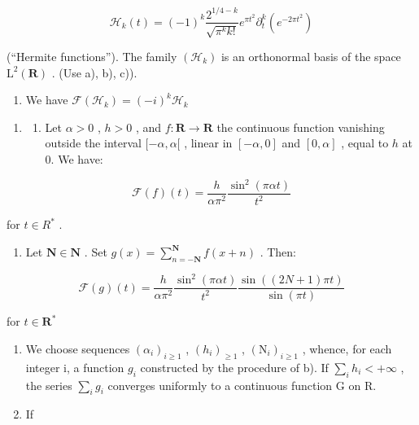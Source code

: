 \[
\mathcal {H} _ {k} (t) = (- 1) ^ {k} \frac {2 ^ {1 / 4 - k}}{\sqrt {\pi^ {k} k !}} e ^ {\pi t ^ {2}} \partial_ {t} ^ {k} (e ^ {- 2 \pi t ^ {2}})
\]

(“Hermite functions”). The family \((\mathcal{H}_{k})\) is an orthonormal basis of the space \(\mathrm{L}^{2}(\mathbf{R})\) . (Use a), b), c)).

\begin{enumerate}
\def\labelenumi{\alph{enumi})}
\setcounter{enumi}{4}
\tightlist
\item
  We have \(\mathcal{F}(\mathcal{H}_k) = (-i)^k\mathcal{H}_k\)
\end{enumerate}

\begin{enumerate}
\def\labelenumi{\arabic{enumi})}
\setcounter{enumi}{3}
\tightlist
\item
  \begin{enumerate}
  \def\labelenumii{\alph{enumii})}
  \tightlist
  \item
    Let \(\alpha > 0\) , \(h > 0\) , and \(f: \mathbf{R} \to \mathbf{R}\) the continuous function vanishing outside the interval \([- \alpha, \alpha[\) , linear in \([- \alpha, 0]\) and \([0, \alpha]\) , equal to \(h\) at 0. We have:
  \end{enumerate}
\end{enumerate}

\[
\mathcal {F} (f) (t) = \frac {h}{\alpha \pi^ {2}} \frac {\sin^ {2} (\pi \alpha t)}{t ^ {2}}
\]

for \(t \in R^{*}\) .

\begin{enumerate}
\def\labelenumi{\alph{enumi})}
\setcounter{enumi}{1}
\tightlist
\item
  Let \(\mathbf{N} \in \mathbf{N}\) . Set \(g(x) = \sum_{n=-\mathbf{N}}^{\mathbf{N}} f(x + n)\) . Then:
\end{enumerate}

\[
\mathcal {F} (g) (t) = \frac {h}{\alpha \pi^ {2}} \frac {\sin^ {2} (\pi \alpha t)}{t ^ {2}} \frac {\sin ((2 N + 1) \pi t)}{\sin (\pi t)}
\]

for \(t\in \mathbf{R}^*\)

\begin{enumerate}
\def\labelenumi{\alph{enumi})}
\setcounter{enumi}{2}
\item
  We choose sequences \((\alpha_{i})_{i\geqslant1}\) , \((h_{i})_{\geqslant1}\) , \((\mathrm{N}_{i})_{i\geqslant1}\) , whence, for each integer i, a function \(g_{i}\) constructed by the procedure of b). If \(\sum_{i} h_{i} < +\infty\) , the series \(\sum_{i} g_{i}\) converges uniformly to a continuous function G on R.
\item
  If
\end{enumerate}

